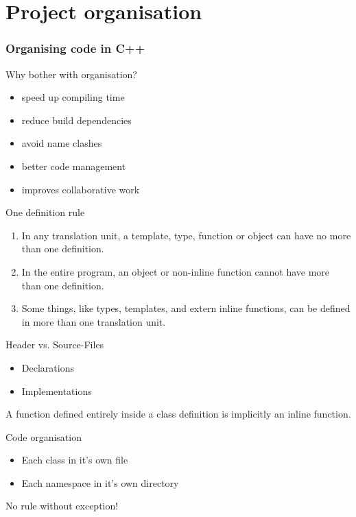 \documentclass{beamer}
\begin{document}
\part{Project organisation}

\section{Organising code in C++}

\begin{frame}{Why bother with organisation?}
\begin{itemize}
  \item speed up compiling time
  \item reduce build dependencies
  \item avoid name clashes
  \item better code management
  \item improves collaborative work
\end{itemize}
\end{frame}

\begin{frame}{One definition rule}
\begin{enumerate}
  \item In any translation unit, a template, type, function or object can have
  no more than one definition.
  \item In the entire program, an object or non-inline function cannot have more
  than one definition.
  \item Some things, like types, templates, and extern inline functions, can be
  defined in more than one translation unit.
\end{enumerate}
\end{frame}

\begin{frame}{Header vs. Source-Files}
\begin{itemize}
  \item [Header] Declarations
  \item [Source] Implementations 
\end{itemize}
A function defined entirely inside a class definition is implicitly an inline
function.
\end{frame}

\begin{frame}{Code organisation}
\begin{itemize}
  \item Each class in it's own file
  \item Each namespace in it's own directory
\end{itemize}
No rule without exception!
\end{frame}
\end{document}
